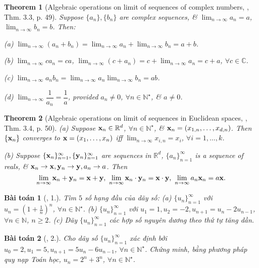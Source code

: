 \documentclass{article}
\newtheorem{baitoan}{Bài toán}
\newtheorem{theorem}{Theorem}
\begin{document}
\begin{theorem}[Algebraic operations on limit of sequences of complex numbers, \cite{Rudin1976}, Thm. 3.3, p. 49]
	Suppose $\{a_n\},\{b_n\}$ are complex sequences, \& $\lim_{n\to\infty} a_n = a$,$\lim_{n\to\infty} b_n = b$. Then:
	\item(a) $\lim_{n\to\infty} (a_n + b_n) = \lim_{n\to\infty} a_n + \lim_{n\to\infty} b_n = a + b$.
	\item(b) $\lim_{n\to\infty} ca_n = ca$, $\lim_{n\to\infty} (c + a_n) = c + \lim_{n\to\infty} a_n = c + a$, $\forall c\in\mathbb{C}$.
	\item(c) $\lim_{n\to\infty} a_nb_n = \lim_{n\to\infty} a_n\lim_{n\to\infty} b_n = ab$.
	\item(d) $\lim_{n\to\infty} \dfrac{1}{a_n} = \dfrac{1}{a}$, provided $a_n\ne0$, $\forall n\in\mathbb{N}^\star$, \& $a\ne0$.
\end{theorem}

\begin{theorem}[Algebraic operations on limit of sequences in Euclidean spaces, \cite{Rudin1976}, Thm. 3.4, p. 50]
	\item(a) Suppose ${\bf x}_n\in\mathbb{R}^d$, $\forall n\in\mathbb{N}^\star$, \& ${\bf x}_n = (x_{1,n},\ldots,x_{d,n})$. Then $\{{\bf x}_n\}$ converges to ${\bf x} = (x_1,\ldots,x_n)$ iff $\lim_{n\to\infty} x_{i,n} = x_i$, $\forall i = 1,\ldots,k$.
	\item(b) Suppose $\{{\bf x}_n\}_{n=1}^\infty,\{{\bf y}_n\}_{n=1}^\infty$ are sequences in $\mathbb{R}^d$, $\{a_n\}_{n=1}^\infty$ is a sequence of reals, \& ${\bf x}_n\to{\bf x},{\bf y}_n\to{\bf y},a_n\to a$. Then
	\begin{equation*}
		\lim_{n\to\infty} {\bf x}_n + {\bf y}_n = {\bf x} + {\bf y},\ \lim_{n\to\infty} {\bf x}_n\cdot{\bf y}_n = {\bf x}\cdot{\bf y},\ \lim_{n\to\infty} a_n{\bf x}_n = a{\bf x}.
	\end{equation*}
\end{theorem}

\begin{baitoan}[\cite{TLCT_dai_so_giai_tich_11}, 1.]
	Tìm $5$ số hạng đầu của dãy số: (a) $\{u_n\}_{n=1}^\infty$ với $u_n = \left(1 + \frac{1}{n}\right)^n$, $\forall n\in\mathbb{N}^\star$. (b) $\{u_n\}_{n=1}^\infty$ với $u_1 = 1,u_2 = -2,u_{n+1} = u_n - 2u_{n-1}$, $\forall n\in\mathbb{N}$, $n\ge2$. (c) Dãy $\{u_n\}_{n=1}^\infty$ các hợp số nguyên dương theo thứ tự tăng dần.
\end{baitoan}

\begin{baitoan}[\cite{TLCT_dai_so_giai_tich_11}, 2.]
	Cho dãy số $\{u_n\}_{n=1}^\infty$ xác định bởi $u_0 = 2,u_1 = 5,u_{n+1} = 5u_n - 6u_{n-1}$, $\forall n\in\mathbb{N}^\star$. Chứng minh, bằng phương pháp quy nạp Toán học, $u_n = 2^n + 3^n$, $\forall n\in\mathbb{N}^\star$.
\end{baitoan}
\end{document}
